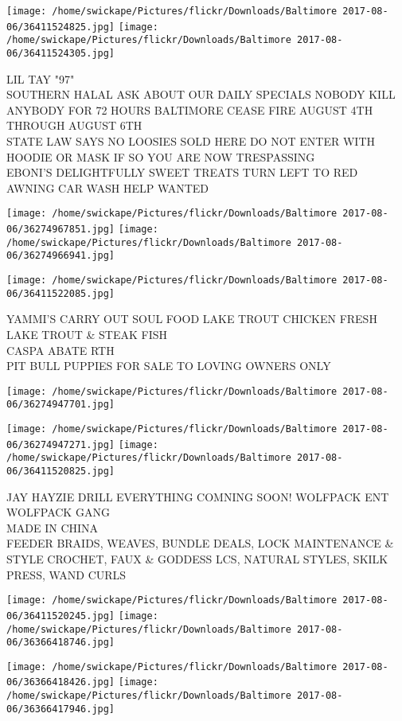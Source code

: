 \documentclass[10pt,letterpaper]{article}
\begin{document}
\texttt{[image: /home/swickape/Pictures/flickr/Downloads/Baltimore 2017-08-06/36411524825.jpg]}
\texttt{[image: /home/swickape/Pictures/flickr/Downloads/Baltimore 2017-08-06/36411524305.jpg]}

LIL TAY "97"\\
SOUTHERN HALAL ASK ABOUT OUR DAILY SPECIALS NOBODY KILL ANYBODY FOR 72 HOURS BALTIMORE CEASE FIRE AUGUST 4TH THROUGH AUGUST 6TH\\
STATE LAW SAYS NO LOOSIES SOLD HERE DO NOT ENTER WITH HOODIE OR MASK IF SO YOU ARE NOW TRESPASSING\\
EBONI'S DELIGHTFULLY SWEET TREATS TURN LEFT TO RED AWNING CAR WASH HELP WANTED
\pagebreak

\texttt{[image: /home/swickape/Pictures/flickr/Downloads/Baltimore 2017-08-06/36274967851.jpg]}
\texttt{[image: /home/swickape/Pictures/flickr/Downloads/Baltimore 2017-08-06/36274966941.jpg]}

\texttt{[image: /home/swickape/Pictures/flickr/Downloads/Baltimore 2017-08-06/36411522085.jpg]}

YAMMI'S CARRY OUT SOUL FOOD LAKE TROUT CHICKEN FRESH LAKE TROUT \& STEAK FISH\\
CASPA ABATE RTH\\
PIT BULL PUPPIES FOR SALE TO LOVING OWNERS ONLY
\pagebreak

\texttt{[image: /home/swickape/Pictures/flickr/Downloads/Baltimore 2017-08-06/36274947701.jpg]}

\vspace{0.25in}
\texttt{[image: /home/swickape/Pictures/flickr/Downloads/Baltimore 2017-08-06/36274947271.jpg]}
\texttt{[image: /home/swickape/Pictures/flickr/Downloads/Baltimore 2017-08-06/36411520825.jpg]}

JAY HAYZIE DRILL EVERYTHING COMNING SOON!  WOLFPACK ENT WOLFPACK GANG\\
MADE IN CHINA\\
FEEDER BRAIDS, WEAVES, BUNDLE DEALS, LOCK MAINTENANCE \& STYLE CROCHET, FAUX \& GODDESS LCS, NATURAL STYLES, SKILK PRESS, WAND CURLS
\pagebreak

\texttt{[image: /home/swickape/Pictures/flickr/Downloads/Baltimore 2017-08-06/36411520245.jpg]}
\texttt{[image: /home/swickape/Pictures/flickr/Downloads/Baltimore 2017-08-06/36366418746.jpg]}

\texttt{[image: /home/swickape/Pictures/flickr/Downloads/Baltimore 2017-08-06/36366418426.jpg]}
\texttt{[image: /home/swickape/Pictures/flickr/Downloads/Baltimore 2017-08-06/36366417946.jpg]}
\end{document}
